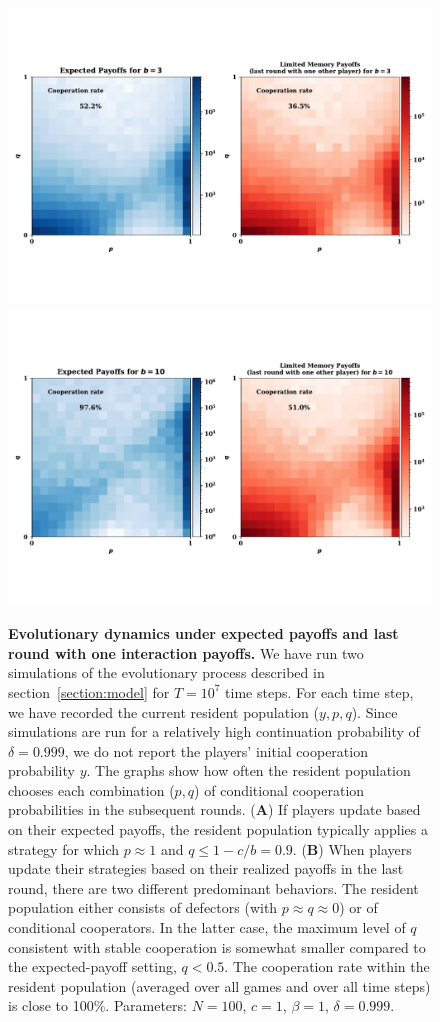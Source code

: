 \documentclass[11pt]{article}
\theoremstyle{plainCl1}
\theoremstyle{plainCl2}
\begin{document}
\begin{figure}[!htbp]
    \centering
    \includegraphics[width=.70\textwidth]{static/expected_and_stochastic_for_donation_game.pdf}\vspace{-3cm}
    \includegraphics[width=.70\textwidth]{static/expected_and_stochastic_for_donation_game_b_10.pdf}
    \caption{{\bf Evolutionary dynamics under expected payoffs and last round with one interaction payoffs.} 
    We have run two simulations of the evolutionary process described in
    section~\ref{section:model} for $T\!=\!10^7$ time steps. For each time step,
    we have recorded the current resident population ($y,p,q$). Since simulations
    are run for a relatively high continuation probability of $\delta\!=\!0.999$, we
    do not report the players' initial cooperation probability $y$. The graphs show
    how often the resident population chooses each combination ($p,q$) of
    conditional cooperation probabilities in the subsequent rounds. ({\bf A}) If
    players update based on their expected payoffs, the resident population
    typically applies a strategy for which $p\!\approx\!1$ and
    $q\!\le\!1\!-\!c/b\!=\!0.9$. ({\bf B})
    When players update their strategies based on their realized payoffs in the last
    round, there are two different predominant behaviors. The resident population
    either consists of defectors (with $p\!\approx\!q\!\approx\!0$) or of
    conditional cooperators. In the latter case, the maximum level of $q$ consistent
    with stable cooperation is somewhat smaller compared to the expected-payoff
    setting, $q\!<\!0.5$. The cooperation rate within the resident population
    (averaged over all games and over all time steps) is close to 100\%. Parameters:
    $N\!=\!100$, $c\!=\!1$, $\beta\!=\!1$, $\delta\!=\!0.999$.}
    \label{fig:expected_and_stochastic_for_donation}
\end{figure}
\end{document}
